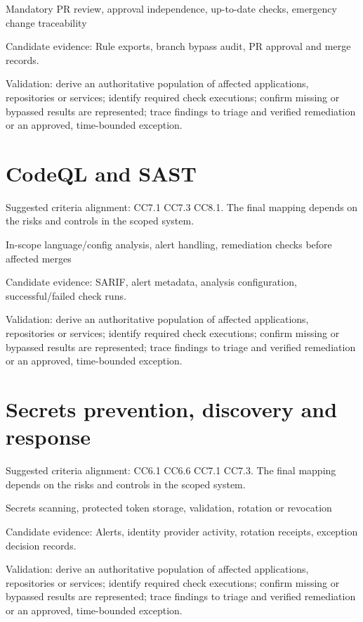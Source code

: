 \documentclass[10pt,oneside]{report}
\begin{document}
\begin{engineeringbox}
Mandatory PR review, approval independence, up-to-date checks, emergency change traceability
\end{engineeringbox}
Candidate evidence: Rule exports, branch bypass audit, PR approval and merge records.

Validation: derive an authoritative population of affected applications, repositories or services; identify required check executions; confirm missing or bypassed results are represented; trace findings to triage and verified remediation or an approved, time-bounded exception.

\section{CodeQL and SAST}
Suggested criteria alignment: CC7.1 CC7.3 CC8.1. The final mapping depends on the risks and controls in the scoped system.

\begin{engineeringbox}
In-scope language/config analysis, alert handling, remediation checks before affected merges
\end{engineeringbox}
Candidate evidence: SARIF, alert metadata, analysis configuration, successful/failed check runs.

Validation: derive an authoritative population of affected applications, repositories or services; identify required check executions; confirm missing or bypassed results are represented; trace findings to triage and verified remediation or an approved, time-bounded exception.

\section{Secrets prevention, discovery and response}
Suggested criteria alignment: CC6.1 CC6.6 CC7.1 CC7.3. The final mapping depends on the risks and controls in the scoped system.

\begin{engineeringbox}
Secrets scanning, protected token storage, validation, rotation or revocation
\end{engineeringbox}
Candidate evidence: Alerts, identity provider activity, rotation receipts, exception decision records.

Validation: derive an authoritative population of affected applications, repositories or services; identify required check executions; confirm missing or bypassed results are represented; trace findings to triage and verified remediation or an approved, time-bounded exception.
\end{document}
